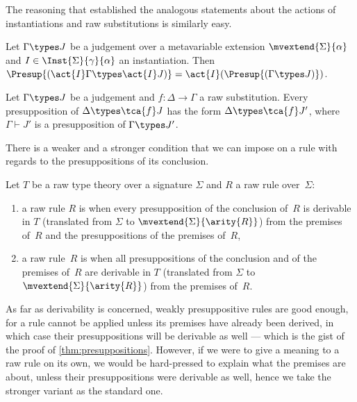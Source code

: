 The reasoning that established the analogous statements about the actions of instantiations and raw substitutions is similarly easy.

\begin{propositionwithqed}
  \label{prop:presuppositions-action-instantiation}
  Let $\Gamma \types J$ be a judgement over a metavariable extension $\mvextend{\Sigma}{\alpha}$ and $I \in \Inst{\Sigma}{\gamma}{\alpha}$ an instantiation.
  Then $\Presup {(\act{I} \Gamma \types \act{I} J)} = \act{I}(\Presup {(\Gamma \types J)})$.
\end{propositionwithqed}

\begin{propositionwithqed}
  \label{prop:presuppositions-action-substitution}
  Let $\Gamma \types J$ be a judgement and $f : \Delta \to \Gamma$ a raw substitution. Every presupposition of $\Delta \types \tca{f} J$
  has the form $\Delta \types \tca{f} J'$, where $\Gamma \vdash J'$ is a presupposition of $\Gamma \types J'$.
\end{propositionwithqed}

There is a weaker and a stronger condition that we can impose on a rule with regards to the presuppositions of its conclusion.

\begin{definition}%
  \label{def:weakly-presuppositive-rule}%
  Let $T$ be a raw type theory over a signature $\Sigma$ and $R$ a raw rule over~$\Sigma$:
  \begin{enumerate}
  \item a raw rule $R$ is  when every presupposition of the conclusion of~$R$ is derivable in $T$ (translated from $\Sigma$ to $\mvextend{\Sigma}{\arity{R}}$) from the premises of~$R$ and the presuppositions of the premises of~$R$,

  \item a raw rule~$R$ is  when all presuppositions of the conclusion and of the premises of~$R$ are derivable in $T$ (translated from $\Sigma$ to $\mvextend{\Sigma}{\arity{R}}$) from the premises of~$R$.
  \end{enumerate}
\end{definition}

As far as derivability is concerned, weakly presuppositive rules are good enough, for a rule cannot be applied unless its premises have already been derived, in which case their presuppositions will be derivable as well --- which is the gist of the proof of \cref{thm:presuppositions}.
%
However, if we were to give a meaning to a raw rule on its own, we would be hard-pressed to explain what the premises are about, unless their presuppositions were derivable as well, hence we take the stronger variant as the standard one.


